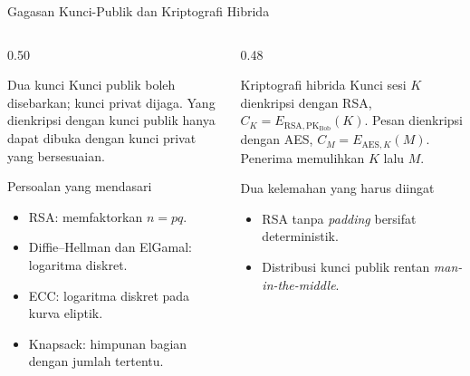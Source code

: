 \documentclass[aspectratio=169,11pt]{beamer}
\begin{document}
\begin{frame}{Gagasan Kunci-Publik dan Kriptografi Hibrida}
    \footnotesize
    \begin{columns}[T,onlytextwidth]
        \begin{column}{0.50\textwidth}
            \begin{block}{Dua kunci}
                Kunci publik boleh disebarkan; kunci privat dijaga. Yang
                dienkripsi dengan kunci publik hanya dapat dibuka dengan kunci
                privat yang bersesuaian.
            \end{block}
            \begin{block}{Persoalan yang mendasari}
                \begin{itemize}
                    \setlength{\itemsep}{1pt}
                    \item RSA: memfaktorkan $n=pq$.
                    \item Diffie--Hellman dan ElGamal: logaritma diskret.
                    \item ECC: logaritma diskret pada kurva eliptik.
                    \item Knapsack: himpunan bagian dengan jumlah tertentu.
                \end{itemize}
            \end{block}
        \end{column}
        \begin{column}{0.48\textwidth}
            \begin{exampleblock}{Kriptografi hibrida}
                Kunci sesi $K$ dienkripsi dengan RSA,
                $C_K=E_{\mathrm{RSA},\mathrm{PK}_{\mathrm{Bob}}}(K)$.
                Pesan dienkripsi dengan AES,
                $C_M=E_{\mathrm{AES},K}(M)$. Penerima memulihkan $K$ lalu $M$.
            \end{exampleblock}
            \begin{alertblock}{Dua kelemahan yang harus diingat}
                \begin{itemize}
                    \setlength{\itemsep}{1pt}
                    \item RSA tanpa \textit{padding} bersifat deterministik.
                    \item Distribusi kunci publik rentan
                          \textit{man-in-the-middle}.
                \end{itemize}
            \end{alertblock}
        \end{column}
    \end{columns}
\end{frame}
\end{document}
